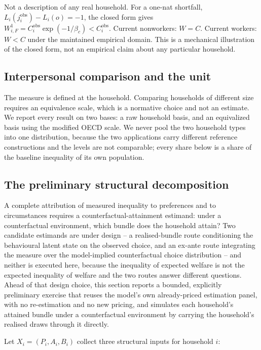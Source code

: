 \documentclass[11pt,a4paper]{article}
\begin{document}
Not a description of any real household. For a one-nat shortfall, \(L_i(j_i^{\mathrm{obs}})-L_i(o)=-1\), the closed form gives \(W^1_{i,F}=C_i^{\mathrm{obs}}\exp(-1/\beta_c)<C_i^{\mathrm{obs}}\). Current nonworkers: \(W=C\). Current workers: \(W<C\) under the maintained empirical domain. This is a mechanical illustration of the closed form, not an empirical claim about any particular household.

\subsection{Interpersonal comparison and the unit}\label{interpersonal-comparison-and-the-unit}

The measure is defined at the household. Comparing households of different size requires an equivalence scale, which is a normative choice and not an estimate. We report every result on two bases: a raw household basis, and an equivalized basis using the modified OECD scale. We never pool the two household types into one distribution, because the two applications carry different reference constructions and the levels are not comparable; every share below is a share of the baseline inequality of its own population.

\subsection{The preliminary structural decomposition}\label{the-preliminary-structural-decomposition}

A complete attribution of measured inequality to preferences and to circumstances requires a counterfactual-attainment estimand: under a counterfactual environment, which bundle does the household attain? Two candidate estimands are under design -- a realised-bundle route conditioning the behavioural latent state on the observed choice, and an ex-ante route integrating the measure over the model-implied counterfactual choice distribution -- and neither is executed here, because the inequality of expected welfare is not the expected inequality of welfare and the two routes answer different questions. Ahead of that design choice, this section reports a bounded, explicitly preliminary exercise that reuses the model's own already-priced estimation panel, with no re-estimation and no new pricing, and simulates each household's attained bundle under a counterfactual environment by carrying the household's realised draws through it directly.

Let \(X_i=(P_i,A_i,B_i)\) collect three structural inputs for household \(i\):
\end{document}
